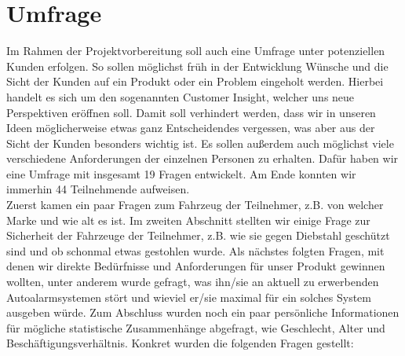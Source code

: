 
\section{Umfrage}
Im Rahmen der Projektvorbereitung soll auch eine Umfrage unter potenziellen Kunden erfolgen. So sollen möglichst früh in der Entwicklung Wünsche und die Sicht der Kunden auf ein Produkt oder ein Problem eingeholt werden. Hierbei handelt es sich um den sogenannten Customer Insight, welcher uns neue Perspektiven eröffnen soll. Damit soll verhindert werden, dass wir in unseren Ideen möglicherweise etwas ganz Entscheidendes vergessen, was aber aus der Sicht der Kunden besonders wichtig ist. Es sollen außerdem auch möglichst viele verschiedene Anforderungen der einzelnen Personen zu erhalten. Dafür haben wir eine Umfrage mit insgesamt 19 Fragen entwickelt. Am Ende konnten wir immerhin 44 Teilnehmende aufweisen.
\\
Zuerst kamen ein paar Fragen zum Fahrzeug der Teilnehmer, z.B. von welcher Marke und wie alt es ist. Im zweiten Abschnitt stellten wir einige Frage zur Sicherheit der Fahrzeuge der Teilnehmer, z.B. wie sie gegen Diebstahl geschützt sind und ob schonmal etwas gestohlen wurde. Als nächstes folgten Fragen, mit denen wir direkte Bedürfnisse und Anforderungen für unser Produkt gewinnen wollten, unter anderem wurde gefragt, was ihn/sie an aktuell zu erwerbenden Autoalarmsystemen stört und wieviel er/sie maximal für ein solches System ausgeben würde. Zum Abschluss wurden noch ein paar persönliche Informationen für mögliche statistische Zusammenhänge abgefragt, wie Geschlecht, Alter und Beschäftigungsverhältnis.
Konkret wurden die folgenden Fragen gestellt:

